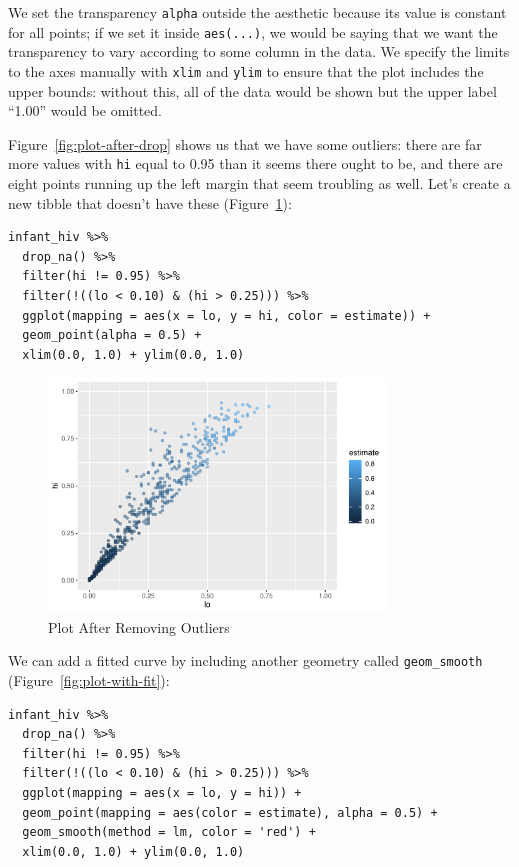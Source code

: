 We set the transparency \texttt{alpha} outside the aesthetic because its value is constant for all points;
if we set it inside \texttt{aes(...)},
we would be saying that we want the transparency to vary according to some column in the data.
We specify the limits to the axes manually with \texttt{xlim} and \texttt{ylim} to ensure that the plot includes the upper bounds:
without this,
all of the data would be shown but the upper label ``1.00'' would be omitted.

Figure~\ref{fig:plot-after-drop} shows us that we have some outliers:
there are far more values with \texttt{hi} equal to 0.95 than it seems there ought to be,
and there are eight points running up the left margin that seem troubling as well.
Let's create a new tibble that doesn't have these (Figure~\ref{fig:plot-remove-outliers}):

\begin{lstlisting}
infant_hiv %>%
  drop_na() %>%
  filter(hi != 0.95) %>%
  filter(!((lo < 0.10) & (hi > 0.25))) %>%
  ggplot(mapping = aes(x = lo, y = hi, color = estimate)) +
  geom_point(alpha = 0.5) +
  xlim(0.0, 1.0) + ylim(0.0, 1.0)
\end{lstlisting}

\begin{figure}[h]
  \includegraphics[width=0.8\textwidth]{figures/tidyverse/plot-remove-outliers-1.pdf}
  \caption{Plot After Removing Outliers}
  \label{fig:plot-remove-outliers}
\end{figure}

We can add a fitted curve by including another geometry called \texttt{geom\_smooth}
(Figure~\ref{fig:plot-with-fit}):

\begin{lstlisting}
infant_hiv %>%
  drop_na() %>%
  filter(hi != 0.95) %>%
  filter(!((lo < 0.10) & (hi > 0.25))) %>%
  ggplot(mapping = aes(x = lo, y = hi)) +
  geom_point(mapping = aes(color = estimate), alpha = 0.5) +
  geom_smooth(method = lm, color = 'red') +
  xlim(0.0, 1.0) + ylim(0.0, 1.0)
\end{lstlisting}

